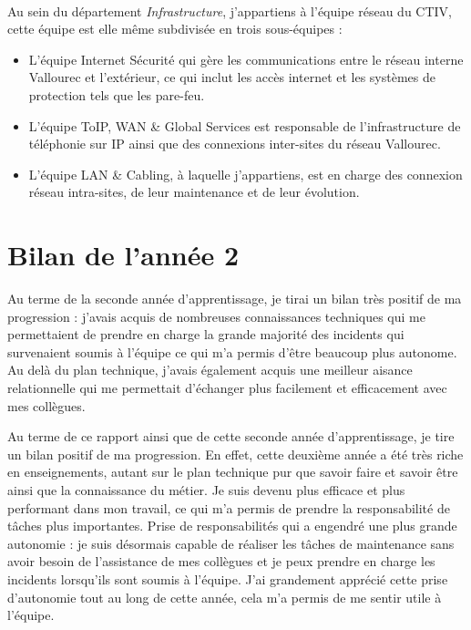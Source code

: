 \documentclass[a4paper,12pt]{report}
\begin{document}
\paragraph{}
Au sein du département \textit{Infrastructure}, j'appartiens à l'équipe réseau du CTIV, cette équipe est elle même subdivisée en trois sous-équipes :
\begin{itemize}
\item L'équipe Internet Sécurité qui gère les communications entre le réseau interne Vallourec et l'extérieur, ce qui inclut les accès internet et les systèmes de protection tels que les pare-feu.
\item L'équipe ToIP, WAN \& Global Services est responsable de l'infrastructure de téléphonie sur IP ainsi que des connexions inter-sites du réseau Vallourec.
\item L'équipe LAN \& Cabling, à laquelle j'appartiens, est en charge des connexion réseau intra-sites, de leur maintenance et de leur évolution.
\end{itemize}

\section{Bilan de l'année 2}
Au terme de la seconde année d'apprentissage, je tirai un bilan très positif de ma progression : j'avais acquis de nombreuses connaissances techniques qui me permettaient de prendre en charge la grande majorité des incidents qui survenaient soumis à l'équipe ce qui m'a permis d'être beaucoup plus autonome. Au delà du plan technique, j'avais également acquis une meilleur aisance relationnelle qui me permettait d'échanger plus facilement et efficacement avec mes collègues.

Au terme de ce rapport ainsi que de cette seconde année d'apprentissage, je tire un bilan positif de ma progression. En effet, cette deuxième année a été très riche en enseignements, autant sur le plan technique pur que savoir faire et savoir être ainsi que la connaissance du métier. Je suis devenu plus efficace et plus performant dans mon travail, ce qui m'a permis de prendre la responsabilité de tâches plus importantes. Prise de responsabilités qui a engendré une plus grande autonomie : je suis désormais capable de réaliser les tâches de maintenance sans avoir besoin de l'assistance de mes collègues et je peux prendre en charge les incidents lorsqu'ils sont soumis à l'équipe. J'ai grandement apprécié cette prise d'autonomie tout au long de cette année, cela m'a permis de me sentir utile à l'équipe.
\end{document}
